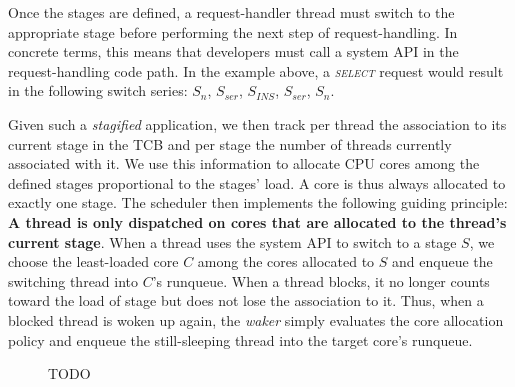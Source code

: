 \documentclass[12pt,a4paper]{book}
\begin{document}
Once the stages are defined, a request-handler thread must switch to the appropriate stage before performing the next step of request-handling.
In concrete terms, this means that developers must call a system API in the request-handling code path.
In the example above, a \textit{\textsc{select}} request would result in the following switch series: $S_n$, $S_{ser}$, $S_{INS}$, $S_{ser}$, $S_n$.


Given such a \emph{stagified} application, we then track per thread the association to its current stage in the TCB and per stage the number of threads currently associated with it.
We use this information to allocate CPU cores among the defined stages proportional to the stages' load.
A core is thus always allocated to exactly one stage. %
The scheduler then implements the following guiding principle: \textbf{A thread is only dispatched on cores that are allocated to the thread's current stage}.
When a thread uses the system API to switch to a stage $S$, we choose the least-loaded core $C$ among the cores allocated to $S$ and enqueue the switching thread into $C$'s runqueue.
When a thread blocks, it no longer counts toward the load of stage but does not lose the association to it.
Thus, when a blocked thread is woken up again, the \emph{waker} simply evaluates the core allocation policy and enqueue the still-sleeping thread into the target core's runqueue.

\begin{figure}[h]
    \caption{TODO}
\end{figure}
\end{document}
